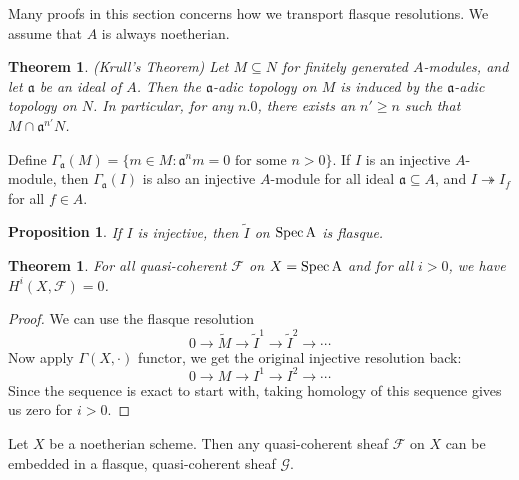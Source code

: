 \documentclass[12pt]{article}
\theoremstyle{plain}
\newtheorem{theorem}[equation]{Theorem}
\newtheorem{proposition}[equation]{Proposition}
\theoremstyle{definition}
\newcommand{\fa}{\mathfrak{a}}
\newcommand{\shF}{\mathscr{F}}
\newcommand{\shG}{\mathscr{G}}
\newcommand{\Spec}{\rm Spec\,}
\newcommand{\<}{\langle}
\renewcommand{\>}{\rangle}
\newcommand{\onto}{\twoheadrightarrow}
\def\wt{\widetilde}
\begin{document}
Many proofs in this section concerns how we transport flasque resolutions. 
We assume that $A$ is always noetherian. 
\begin{theorem}
\emph{(Krull's Theorem)}
Let $M \subseteq N$ for finitely generated $A$-modules, and let $\fa$ be an ideal of $A$. Then the $\fa$-adic topology on $M$ is induced by the $\fa$-adic topology on $N$. In particular, for any $n . 0$, there exists an $n' \ge n$ such that $M \cap \fa^{n'} N $. 
\end{theorem}

Define $\Gamma_\fa(M) = \{ m \in M : \fa^n m = 0 \text{ for some }n > 0\}$. If $I$ is an injective $A$-module, then $\Gamma_\fa(I)$ is also an injective $A$-module for all ideal $\fa \subseteq A$, and $I \onto I_f$ for all $f \in A$. 

\begin{proposition}
If $I$ is injective, then $\wt{I}$ on $\Spec A$ is flasque. 
\end{proposition}

\begin{theorem}
For all quasi-coherent $\shF$ on $X = \Spec A$ and for all $i > 0$, we have 
$H^i(X, \shF) = 0$. 
\end{theorem}
\begin{proof}
We can use the flasque resolution 
$$ 0 \to \wt{M} \to \wt{I}^1 \to \wt{I}^2 \to \cdots $$
Now apply $\Gamma(X, \cdot)$ functor, we get the original injective resolution back: 
$$ 0 \to M \to I^1 \to I^2 \to \cdots$$ 
Since the sequence is exact to start with, taking homology of this sequence gives us zero for $i > 0$. 
\end{proof}

Let $X$ be a noetherian scheme. Then any quasi-coherent sheaf $\shF$ on $X$ can be embedded in a flasque, quasi-coherent sheaf $\shG$. 
\end{document}
